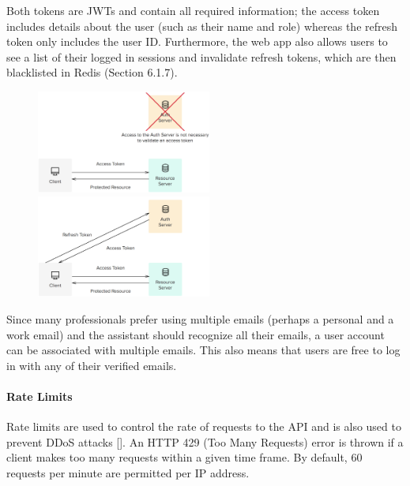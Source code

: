 \documentclass{article}
\begin{document}
Both tokens are JWTs and contain all required information; the access token includes details about the user (such as their name and role) whereas the refresh token only includes the user ID. Furthermore, the web app also allows users to see a list of their logged in sessions and invalidate refresh tokens, which are then blacklisted in Redis (Section 6.1.7).

\begin{figure}
	\centering
	\begin{minipage}{.47\textwidth}
		\centering
		\includegraphics[width=5.75cm]{access-token.png}
	\end{minipage}%
	\hspace{.5cm}
	\begin{minipage}{.47\textwidth}
		\centering
		\includegraphics[width=5.75cm]{refresh-token.png}
	\end{minipage}
\end{figure}

Since many professionals prefer using multiple emails (perhaps a personal and a work email) and the assistant should recognize all their emails, a user account can be associated with multiple emails. This also means that users are free to log in with any of their verified emails.

\paragraph{Rate Limits}

Rate limits are used to control the rate of requests to the API and is also used to prevent DDoS attacks []. An HTTP 429 (Too Many Requests) error is thrown if a client makes too many requests within a given time frame. By default, 60 requests per minute are permitted per IP address.
\end{document}
